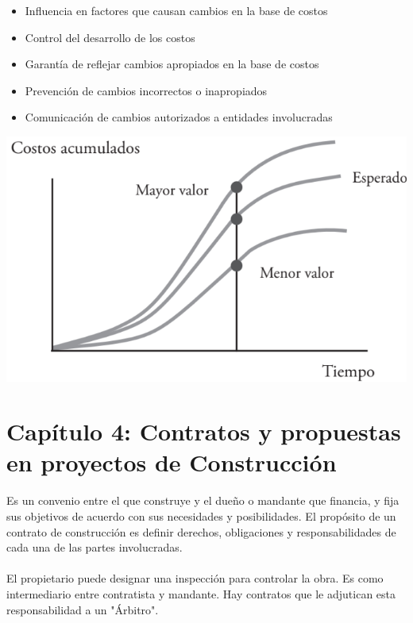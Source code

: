\documentclass{article} %
\begin{document}
\begin{minipage}{0.45\textwidth}
    \begin{itemize}
    \item Influencia en factores que causan cambios en la base de costos
    \item Control del desarrollo de los costos
    \item Garantía de reflejar cambios apropiados en la base de costos
    \item Prevención de cambios incorrectos o inapropiados
    \item Comunicación de cambios autorizados a entidades involucradas
    \end{itemize}
\end{minipage}
\hfill
\begin{minipage}{0.5\textwidth}
    \centering
    \includegraphics[width=\textwidth]{curva_s.png}
\end{minipage}

\section{Capítulo 4: Contratos y propuestas en proyectos de Construcción}

Es un convenio entre el que construye y el dueño o mandante que financia, y fija sus objetivos
de acuerdo con sus necesidades y posibilidades. El propósito de un contrato de construcción
es definir derechos, obligaciones y responsabilidades de cada una de las partes involucradas.
\\\\
El propietario puede designar una inspección para controlar la obra. Es como intermediario entre
contratista y mandante. Hay contratos que le adjutican esta responsabilidad a un "Árbitro".
\end{document}
